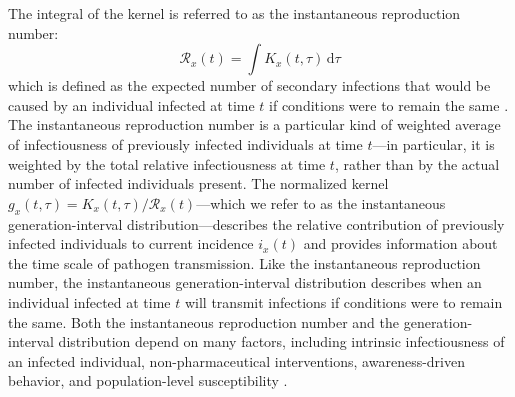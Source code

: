 \documentclass[12pt]{article}
\newcommand{\RR}{\ensuremath{{\mathcal R}}\xspace}
\newcommand{\dd}[1]{\ensuremath{\, \mathrm{d}#1}}
\newcommand{\dtau}{\dd{\tau}}
\begin{document}
The integral of the kernel is referred to as the instantaneous reproduction number:
\begin{equation}
\RR_x(t) = \int K_x(t, \tau) \dtau
\label{eq:instR}
\end{equation}
which is defined as the expected number of secondary infections that would be caused by an individual infected at time $t$ if conditions were to remain the same \citep{fraser2007estimating}.
The instantaneous reproduction number is a particular kind of weighted average of infectiousness of previously infected individuals at time $t$---in particular, it is weighted by the total relative infectiousness at time $t$, rather than by the actual number of infected individuals present.
The normalized kernel $g_x(t, \tau) = K_x(t, \tau)/\RR_x(t)$---which we refer to as the instantaneous generation-interval distribution---describes the relative contribution of previously infected individuals to current incidence $i_x(t)$ and provides information about the time scale of pathogen transmission.
Like the instantaneous reproduction number, the instantaneous generation-interval distribution describes when an individual infected at time $t$ will transmit infections if conditions were to remain the same.
Both the instantaneous reproduction number and the generation-interval distribution depend on many factors, including intrinsic infectiousness of an infected individual, non-pharmaceutical interventions, awareness-driven behavior, and population-level susceptibility \citep{fraser2007estimating}.
\end{document}
